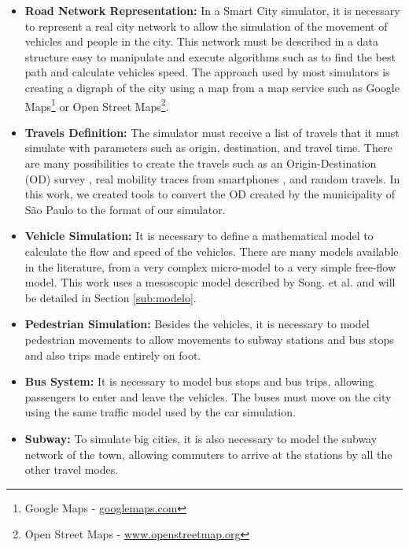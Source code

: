 \begin{itemize}

\item \textbf{Road Network Representation: } In a Smart City simulator, it is necessary to represent a real city network to allow the simulation of the movement of vehicles and people in the city. This network must be described in a data structure easy to manipulate and execute algorithms such as to find the best path and calculate vehicles speed. The approach used by most simulators is creating a digraph of the city using a map from a map service such as Google Maps\footnote{Google Maps - \url{googlemaps.com}} or Open Street Maps\footnote{Open Street Maps - \url{www.openstreetmap.org}}.

\item \textbf{Travels Definition: } The simulator must receive a list of travels that it must simulate with parameters such as origin, destination, and travel time. There are many possibilities to create the travels such as an Origin-Destination (OD) survey \cite{khan2016accurately}, real mobility traces from smartphones \cite{jamil2014crowdsensing}, and random travels. In this work, we created tools to convert the OD created by the municipality of S\~ao Paulo to the format of our simulator.

\item \textbf{Vehicle Simulation: } It is necessary to define a mathematical model to calculate the flow and speed of the vehicles. There are many models available in the literature, from a very complex micro-model to a very simple free-flow model. This work uses a mesoscopic model described by Song. et al. \cite{song2017gpusimulation} and will be detailed in Section \ref{sub:modelo}.

\item \textbf{Pedestrian Simulation: } Besides the vehicles, it is necessary to model pedestrian movements to allow movements to subway stations and bus stops and also trips made entirely on foot. 

\item \textbf{Bus System: } It is necessary to model bus stops and bus trips, allowing passengers to enter and leave the vehicles. The buses must move on the city using the same traffic model used by the car simulation. 

\item \textbf{Subway: } To simulate big cities, it is also necessary to model the subway network of the town, allowing commuters to arrive at the stations by all the other travel modes.


\end{itemize}
